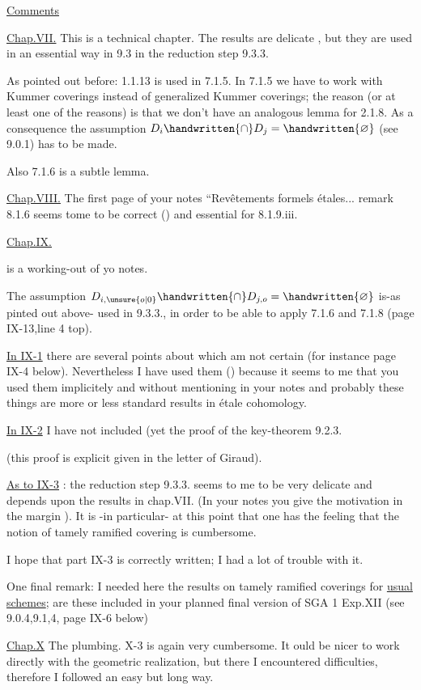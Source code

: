 
\uline{Comments}

\uline{Chap.VII.} This is a technical chapter. The results are delicate , but they are used in an essential way in 9.3 in the reduction step 9.3.3.

As pointed out before: 1.1.13 is used in 7.1.5. In 7.1.5 we have to work with Kummer coverings instead of generalized Kummer coverings; the reason (or at least one of the reasons) is that we don't have an analogous lemma for 2.1.8. As a consequence the assumption $D_i\handwritten{\cap}D_j=\handwritten{\varnothing}$ (see 9.0.1) has to be made.

Also 7.1.6 is a subtle lemma.

\uline{Chap.VIII.} The first page of your notes ``Revêtements formels étales... remark 8.1.6 seems tome to be correct (\handwritten{!}) and essential for 8.1.9.iii.

\uline{Chap.IX.}

 is a working-out of yo notes.

The assumption $D_{i,\unsure{o|0}}\handwritten{\cap}D_{j,o}=\handwritten{\varnothing}$ is-as pinted out above- used in 9.3.3., in order to be able to apply 7.1.6 and 7.1.8 (page IX-13,line 4 top).

\uline{In IX-1} there are several points about which  am not certain (for instance page IX-4 below). Nevertheless I have used them (\handwritten{!}) because it seems to me that you used them implicitely and without mentioning in your notes and probably these things are more or less standard results in étale cohomology.

\uline{In IX-2} I have not included (yet the proof of the key-theorem 9.2.3.

(this proof is explicit given in the letter of Giraud).

\uline{As to IX-3} : the reduction step 9.3.3. seems to me to be very delicate and depends upon the results in chap.VII. (In your notes you give the motivation in the margin \handwritten{!}). It is -in particular- at this point that one has the feeling that the notion of tamely ramified covering is cumbersome.

I hope that part IX-3 is correctly written; I had a lot of trouble with it.

One final remark: I needed here the results on tamely ramified coverings for \uline{usual schemes}; are these included in your planned final version of SGA 1 Exp.XII (see 9.0.4,9.1,4, page IX-6 below)

\uline{Chap.X} The plumbing. X-3 is again very cumbersome. It ould be nicer to work directly with the geometric realization, but there I encountered difficulties, therefore I followed an easy but long way.

